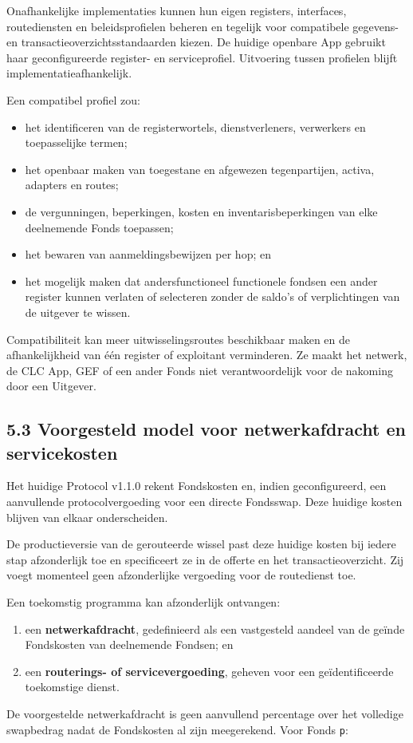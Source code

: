 \documentclass[11pt]{article}
\begin{document}
Onafhankelijke implementaties kunnen hun eigen registers, interfaces, routediensten en beleidsprofielen beheren en tegelijk voor compatibele gegevens- en transactieoverzichtsstandaarden kiezen. De huidige openbare App gebruikt haar geconfigureerde register- en serviceprofiel. Uitvoering tussen profielen blijft implementatieafhankelijk.

Een compatibel profiel zou:

\begin{itemize}[leftmargin=*]
\item het identificeren van de registerwortels, dienstverleners, verwerkers en toepasselijke termen;
\item het openbaar maken van toegestane en afgewezen tegenpartijen, activa, adapters en routes;
\item de vergunningen, beperkingen, kosten en inventarisbeperkingen van elke deelnemende Fonds toepassen;
\item het bewaren van aanmeldingsbewijzen per hop; en
\item het mogelijk maken dat andersfunctioneel functionele fondsen een ander register kunnen verlaten of selecteren zonder de saldo's of verplichtingen van de uitgever te wissen.
\end{itemize}
Compatibiliteit kan meer uitwisselingsroutes beschikbaar maken en de afhankelijkheid van één register of exploitant verminderen. Ze maakt het netwerk, de CLC App, GEF of een ander Fonds niet verantwoordelijk voor de nakoming door een Uitgever.

\subsection*{5.3 Voorgesteld model voor netwerkafdracht en servicekosten}

Het huidige Protocol v1.1.0 rekent Fondskosten en, indien geconfigureerd, een aanvullende protocolvergoeding voor een directe Fondsswap. Deze huidige kosten blijven van elkaar onderscheiden.

De productieversie van de gerouteerde wissel past deze huidige kosten bij iedere stap afzonderlijk toe en specificeert ze in de offerte en het transactieoverzicht. Zij voegt momenteel geen afzonderlijke vergoeding voor de routedienst toe.

Een toekomstig programma kan afzonderlijk ontvangen:

\begin{enumerate}[leftmargin=*]
\item een \textbf{netwerkafdracht}, gedefinieerd als een vastgesteld aandeel van de geïnde Fondskosten van deelnemende Fondsen; en
\item een \textbf{routerings- of servicevergoeding}, geheven voor een geïdentificeerde toekomstige dienst.
\end{enumerate}
De voorgestelde netwerkafdracht is geen aanvullend percentage over het volledige swapbedrag nadat de Fondskosten al zijn meegerekend. Voor Fonds \texttt{p}:
\end{document}
